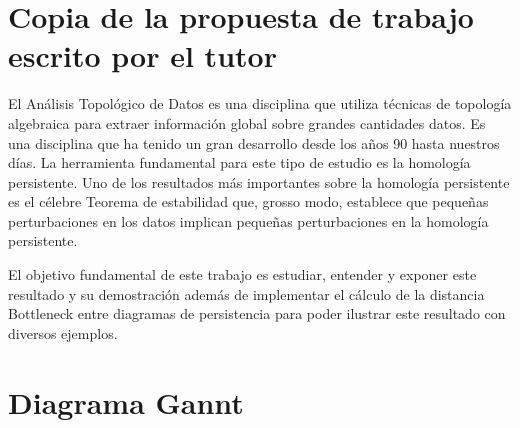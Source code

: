 \documentclass[a4paper, 12pt]{article}
\begin{document}
\section{Copia de la propuesta de trabajo escrito por el tutor}

El Análisis Topológico de Datos es una disciplina que utiliza técnicas de topología algebraica para extraer información global sobre grandes cantidades datos. Es una disciplina que ha tenido un gran desarrollo desde los años 90 hasta nuestros días. La herramienta fundamental para este tipo de estudio es la homología persistente. Uno de los resultados más importantes sobre la homología persistente es el célebre Teorema de estabilidad que, grosso modo, establece que pequeñas perturbaciones en los datos implican pequeñas perturbaciones en la homología persistente.

El objetivo fundamental de este trabajo es estudiar, entender y exponer este resultado y su demostración además de implementar el cálculo de la distancia Bottleneck entre diagramas de persistencia para poder ilustrar este resultado con diversos ejemplos.

\section{Diagrama Gannt}

\begin{landscape}

\end{landscape}
\end{document}
